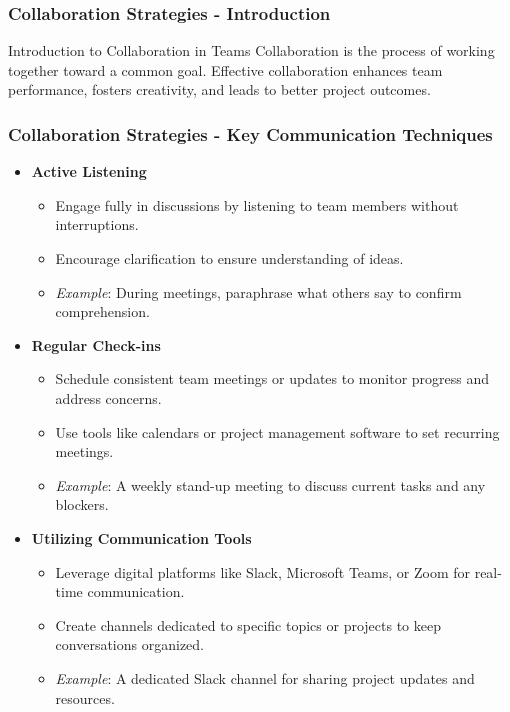 \documentclass{beamer}
\begin{document}
\begin{frame}[fragile]
    \frametitle{Collaboration Strategies - Introduction}
    \begin{block}{Introduction to Collaboration in Teams}
        Collaboration is the process of working together toward a common goal. Effective collaboration enhances team performance, fosters creativity, and leads to better project outcomes.
    \end{block}
\end{frame}

\begin{frame}[fragile]
    \frametitle{Collaboration Strategies - Key Communication Techniques}
    \begin{itemize}
        \item \textbf{Active Listening}
            \begin{itemize}
                \item Engage fully in discussions by listening to team members without interruptions.
                \item Encourage clarification to ensure understanding of ideas.
                \item \textit{Example}: During meetings, paraphrase what others say to confirm comprehension.
            \end{itemize}
            
        \item \textbf{Regular Check-ins}
            \begin{itemize}
                \item Schedule consistent team meetings or updates to monitor progress and address concerns.
                \item Use tools like calendars or project management software to set recurring meetings.
                \item \textit{Example}: A weekly stand-up meeting to discuss current tasks and any blockers.
            \end{itemize}

        \item \textbf{Utilizing Communication Tools}
            \begin{itemize}
                \item Leverage digital platforms like Slack, Microsoft Teams, or Zoom for real-time communication.
                \item Create channels dedicated to specific topics or projects to keep conversations organized.
                \item \textit{Example}: A dedicated Slack channel for sharing project updates and resources.
            \end{itemize}
            

\end{itemize}
\end{frame}
\end{document}

